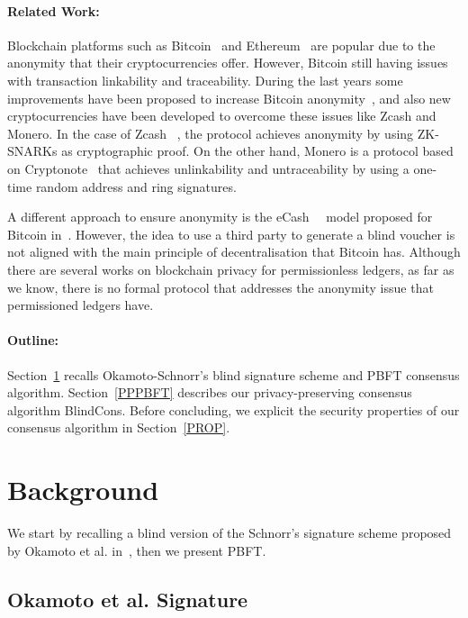 \documentclass[conference]{IEEEtran}
\newcommand{\name}{BlindCons}
\begin{document}
\paragraph*{Related Work:}

Blockchain platforms such as Bitcoin~\cite{nakamoto2008bitcoin} and Ethereum~\cite{wood2014ethereum} are popular due to the anonymity that their cryptocurrencies offer. However, Bitcoin still having issues with transaction linkability and traceability.  During the last years some improvements have been proposed to increase Bitcoin anonymity~\cite{saxena2014increasing}, and also new cryptocurrencies have been developed to overcome these issues like Zcash and Monero. In the case of Zcash ~\cite{hopwood2016zcash}, the protocol achieves anonymity by using ZK-SNARKs as cryptographic proof. On the other hand, Monero is a protocol based on Cryptonote~\cite{van2013cryptonote} that achieves unlinkability and untraceability by using a one-time random address and ring signatures.

A different approach to ensure anonymity is the eCash~\cite{chaum1983blind}~\cite{chaum1988untraceable} model proposed for Bitcoin in~\cite{heilman2016blindly}. However, the idea to use a third party to generate a blind voucher is not aligned with the main principle of decentralisation that Bitcoin has. Although there are several works on blockchain privacy for permissionless ledgers, as far as we know, there is no formal protocol that addresses the anonymity issue that permissioned ledgers have.

\paragraph*{Outline:}  Section~\ref{back} recalls  Okamoto-Schnorr's blind signature scheme and PBFT consensus algorithm. Section~\ref{PPPBFT} describes our privacy-preserving consensus algorithm \name{}. Before concluding, we explicit the security properties of our consensus algorithm in Section~\ref{PROP}.


\section{Background} \label{back}

We start by recalling a blind version of the Schnorr's signature scheme proposed by Okamoto et al. in~\cite{okamoto1992provably}, then we present PBFT.

\subsection{Okamoto et al. Signature}
\label{Okamoto}
\end{document}
